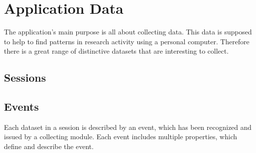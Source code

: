 \chapter{Application Data}
\label{ch:data}


The application's main purpose is all about collecting data. This data is supposed to help to find patterns in research activity using a personal computer. Therefore there is a great range of distinctive datasets that are interesting to collect.

\section{Sessions}
\begin{itemize}



\end{itemize}

\section{Events}

Each dataset in a \gls{session} is described by an \gls{event}, which has been recognized and issued by a collecting \gls{module}. Each \gls{event} includes multiple properties, which define and describe the \gls{event}.

